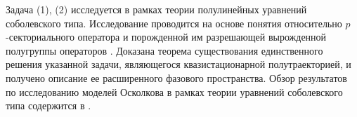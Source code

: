 Задача (1), (2) исследуется в рамках теории полулинейных уравнений соболевского типа.
Исследование проводится
на основе понятия относительно $p$-секториального оператора и порожденной им разрешающей вырожденной полугруппы операторов %
\cite{SGALST}. Доказана теорема существования единственного решения указанной задачи, являющегося квазистационарной полутраекторией, и получено описание ее расширенного фазового пространства.
 Обзор %
 результатов по исследованию моделей Осколкова в рамках теории уравнений соболевского типа содержится в   \cite{STG22}.
%

